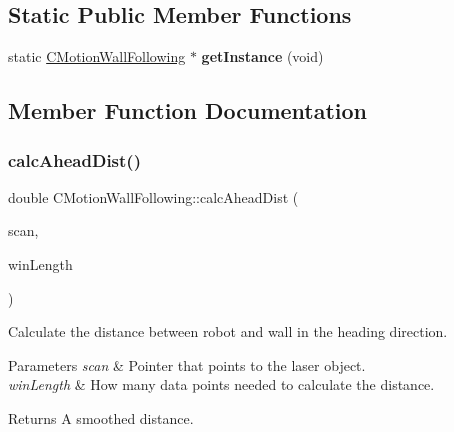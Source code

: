 \subsection*{Static Public Member Functions}
\begin{DoxyCompactItemize}
\item 
\mbox{\label{classmotion_1_1CMotionWallFollowing_a8758349202ccb49d5b0927066b4201cd}} 
static \mbox{\hyperlink{classmotion_1_1CMotionWallFollowing}{C\+Motion\+Wall\+Following}} $\ast$ {\bfseries get\+Instance} (void)
\end{DoxyCompactItemize}


\subsection{Member Function Documentation}
\mbox{\label{classmotion_1_1CMotionWallFollowing_a5aa008f88629f10b7d44e528476ba03d}} 
\subsubsection{\texorpdfstring{calc\+Ahead\+Dist()}{calcAheadDist()}}
{\footnotesize\ttfamily double C\+Motion\+Wall\+Following\+::calc\+Ahead\+Dist (\begin{DoxyParamCaption}\item[{mrpt\+::obs\+::\+C\+Observation2\+D\+Range\+Scan $\ast$}]{scan,  }\item[{size\+\_\+t}]{win\+Length }\end{DoxyParamCaption})}

Calculate the distance between robot and wall in the heading direction. 
\begin{DoxyParams}{Parameters}
{\em scan} & Pointer that points to the laser object. \\
\hline
{\em win\+Length} & How many data points needed to calculate the distance. \\
\hline
\end{DoxyParams}
\begin{DoxyReturn}{Returns}
A smoothed distance. 
\end{DoxyReturn}
\mbox{\label{classmotion_1_1CMotionWallFollowing_afac9dc0c411ecc1effcea072964512e6}} 
